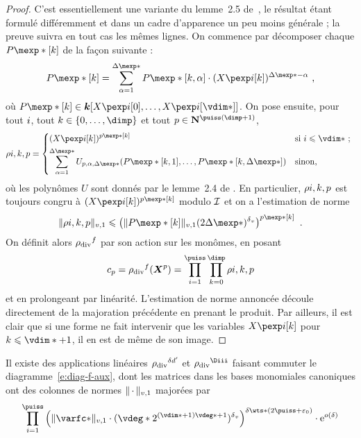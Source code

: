 \begin{proof}
  C'est essentiellement une variante du lemme~2.5 de~\cite{remivg}, le résultat
  étant formulé différemment et dans un cadre d'apparence un peu moins
  générale ; la preuve suivra en tout cas les mêmes lignes. On commence par
  décomposer chaque \( P\mexp*[\ind] \) de la façon suivante :
  \begin{equation}
    P\mexp*[\ind]
    =
    \sum _{\alpha=1}^{\Delta\mexp*}
    P\mexp*[\ind, \alpha] \cdot (\cmh\fct[\ind])^{\Delta\mexp* - \alpha}
    \pmm,
  \end{equation}
  où \( P\mexp*[\ind] \in \cdn [ \cmh\fct[0], \dots, \cmh\fct[\vdim*] ] \).
  On pose ensuite, pour tout \( i \), tout
  \( \ind \in \{ 0, \dots, \dimp \} \) et tout
  \( p \in \N^{\puiss(\dimp+1)} \),
  \begin{equation}
    \rho{\fct, \ind, p}
    =
    \begin{dcases*}
      ( \cmh\fct[\ind] ) ^{p\mexp*[\ind]}
      & si \( \fct \le \vdim* \) ;
      \\
      \sum _{\alpha=1}^{\Delta\mexp*}
      U_{p, \alpha, \Delta\mexp*}
      ( P\mexp*[\ind, 1], \dots, P\mexp*[\ind, \Delta\mexp*] )
      & sinon,
    \end{dcases*}
  \end{equation}
  où les polynômes \( U \) sont donnés par le lemme~2.4 de \cite{remivg}. En
  particulier, \( \rho{i, k, p} \) est toujours congru à
  \( ( \cmh\fct[\ind] ) ^{p\mexp*[\ind]} \) modulo \( \mathcal I \) et on a
  l'estimation de norme
  \begin{equation}
    \nv1{ \rho{\fct, \ind, p} }
    \le
    \left(
    \nv1{ P\mexp*[\ind] } (2\Delta\mexp*)^\dv
    \right) ^{p\mexp*[\ind]}
    \pmm.
  \end{equation}
  On définit alors \( { \rho_{\text{\normalfont div}} }^f \) par son action sur les monômes, en posant
  \begin{equation}
    c_p
    = \rdiv^f(\cmmh^p)
    = \prod\fctrange \prod\indrange \rho{\fct, \ind, p}
  \end{equation}
  et en prolongeant par linéarité. L'estimation de norme annoncée découle
  directement de la majoration précédente en prenant le produit. Par ailleurs,
  il est clair que si une forme ne fait intervenir que les variables \(
  \cmh\fct[\ind] \) pour \( \ind \le \vdim* + 1 \), il en est de même de son
  image.
\end{proof}

\begin{coro} \label{c:hmat-rdiv}
  Il existe des applications linéaires \( { \rho_{\text{\normalfont div}} }^{\delta d'} \) et \( \rdiv^\Diii \)
  faisant commuter le diagramme~\ref{e:diag-f-aux}, dont les matrices dans
  les bases monomiales canoniques ont des colonnes de normes \( \lVert{\,\cdot\,}\rVert_{v, 1} \)
  majorées par
  \begin{equation}
    \prod\fctrange \left(
    \nv1{ \varfc* }
    \cdot ( \vdeg* 2^{(\vdim*+1)\vdeg* + 1} )^\dv
    \right) ^{ \delta \wts* (2\puiss + \epsz) }
    \cdot \expb^{ o(\delta) }
  \end{equation}
\end{coro}

